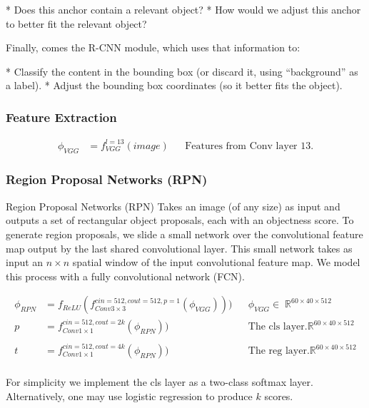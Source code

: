 \documentclass{article}
\DeclareMathOperator{\Reals}{\mathbb{R}}
\begin{document}
* Does this anchor contain a relevant object?
* How would we adjust this anchor to better fit the relevant object?

Finally, comes the R-CNN module, which uses that information to:

* Classify the content in the bounding box (or discard it, using “background” as a label).
* Adjust the bounding box coordinates (so it better fits the object).


\subsubsection{Feature Extraction}

\begin{align*}
    \phi_{VGG} &= f_{VGG}^{l=13}(image) && \text{Features from Conv layer 13.}
\end{align*}

\subsubsection{Region Proposal Networks (RPN)}

Region Proposal Networks (RPN) Takes an image (of any size) as input and outputs a set of rectangular object proposals, each with an objectness score. 
To generate region proposals, we slide a small network over the convolutional feature map output by the last shared convolutional layer. 
This small network takes as input an $n \times n$ spatial window of the input convolutional feature map. 
We model this process with a fully convolutional network (FCN).

\begin{align*}
    \phi_{RPN} &= f_{ReLU}(f_{Conv3\times3}^{cin=512,cout=512,p=1}(\phi_{VGG}))) && \phi_{VGG}\in\Reals^{60 \times 40 \times 512} \\
    p &= f_{Conv1\times1}^{cin=512,cout=2k}(\phi_{RPN})) && \text{The cls layer.} \Reals^{60 \times 40 \times 512} \\ \\
    t &= f_{Conv1\times1}^{cin=512,cout=4k}(\phi_{RPN})) && \text{The reg layer.} \Reals^{60 \times 40 \times 512} \\
\end{align*}

For simplicity we implement the cls layer as a two-class softmax layer. 
Alternatively, one may use logistic regression to produce $k$ scores.
\end{document}
